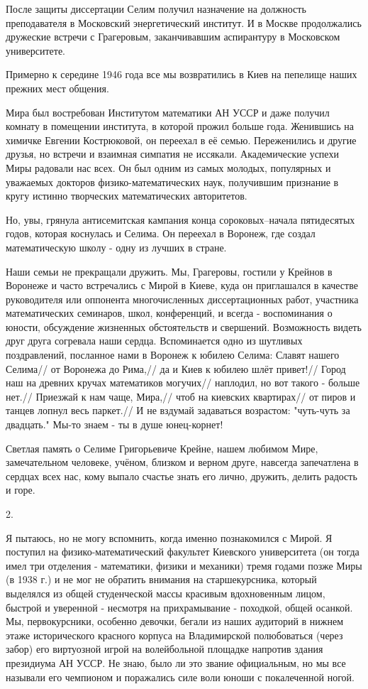После защиты диссертации Селим получил назначение на должность преподавателя в Московский энергетический институт.
И в Москве продолжались дружеские встречи с Грагеровым, заканчивавшим аспирантуру в Московском
\linebreak
университете.

Примерно к середине 1946 года все мы возвратились в Киев на пепелище наших прежних мест общения.

Мира был востребован Институтом математики АН УССР и даже получил комнату в помещении института, в которой прожил больше года. Женившись на химичке Евгении Кострюковой, он переехал в её семью. Переженились и другие друзья, но встречи и взаимная симпатия не иссякали. Академические успехи Миры радовали нас всех. Он был одним из самых молодых, популярных и уважаемых докторов физико-математических наук, получившим признание в кругу истинно творческих математических авторитетов.

Но, увы, грянула антисемитская кампания конца со\-ро\-ко\-вых--начала пятидесятых годов, которая коснулась и Селима.
Он переехал в Воронеж, где создал математическую школу - одну из лучших в стране.

Наши семьи не прекращали дружить. Мы, Грагеровы, гостили у Крейнов в Воронеже и часто встречались с Мирой в Киеве, куда он приглашался в качестве руководителя или оппонента многочисленных диссертационных работ, участника математических семинаров, школ, конференций, и всегда - воспоминания о юности, обсуждение жизненных обстоятельств и свершений. Возможность видеть друг друга согревала наши сердца. Вспоминается одно из шутливых поздравлений, посланное нами в Воронеж к юбилею Селима:
Славят нашего Селима//
от Воронежа до Рима,//
да и Киев к юбилею шлёт привет!//
Город наш на древних кручах математиков могучих//
наплодил, но вот такого - больше нет.//
Приезжай к нам чаще, Мира,//
чтоб на киевских квартирах//
от пиров и танцев лопнул весь паркет.//
И не вздумай задаваться возрастом: "чуть-чуть за двадцать." Мы-то знаем - ты в душе юнец-корнет!

Светлая память о Селиме Григорьевиче Крейне, нашем любимом Мире, замечательном человеке, учёном, близком и верном друге, навсегда запечатлена в сердцах всех нас, кому выпало счастье знать его лично, дружить, делить радость и горе.

2.

Я пытаюсь, но не могу вспомнить, когда именно познакомился с Мирой. Я поступил на физико-математический факультет Киевского университета (он тогда имел три отделения - математики, физики и механики) тремя годами позже Миры (в 1938 г.) и не мог не обратить внимания на старшекурсника, который выделялся из общей студенческой массы красивым вдохновенным лицом, быстрой и уверенной - несмотря на прихрамывание - походкой, общей осанкой. Мы, первокурсники, особенно девочки, бегали из наших аудиторий в нижнем этаже исторического красного корпуса на Владимирской полюбоваться (через забор) его виртуозной игрой на волейбольной площадке напротив здания президиума АН УССР. Не знаю, было ли это звание официальным, но мы все называли его чемпионом и поражались силе воли юноши с покалеченной ногой.

